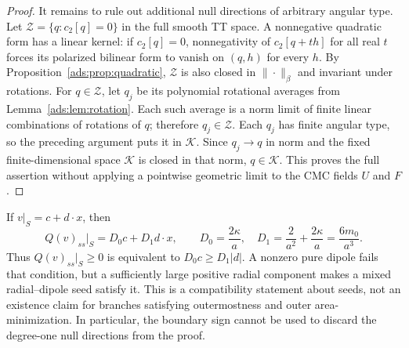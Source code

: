 \begin{proof}
It remains to rule out additional null directions of arbitrary angular
type.  Let $\mathcal Z=\{q:c_2[q]=0\}$ in the full smooth TT space.
A nonnegative quadratic form has a linear kernel: if $c_2[q]=0$,
nonnegativity of $c_2[q+th]$ for all real $t$ forces its polarized
bilinear form to vanish on $(q,h)$ for every $h$.
By Proposition~\ref{ads:prop:quadratic}, $\mathcal Z$ is also closed in
$\|\cdot\|_\beta$ and invariant under rotations.
For $q\in\mathcal Z$, let $q_j$ be its polynomial rotational averages
from Lemma~\ref{ads:lem:rotation}.  Each such average is a norm limit of
finite linear combinations of rotations of $q$; therefore
$q_j\in\mathcal Z$.  Each $q_j$ has finite angular type, so the
preceding argument puts it in $\mathcal K$.
Since $q_j\to q$ in norm and the fixed finite-dimensional space
$\mathcal K$ is closed in that norm, $q\in\mathcal K$.
This proves the full assertion without applying a pointwise geometric
limit to the CMC fields $U$ and $F$.
\end{proof}

\begin{remark}
\label{ads:rem:kernel-sign}
If $v|_S=c+d\cdot x$, then
\[
 Q(v)_{ss}|_S=D_0c+D_1d\cdot x,
 \qquad D_0=\frac{2\kappa}{a},\quad
 D_1=\frac2{a^2}+\frac{2\kappa}{a}=\frac{6m_0}{a^3}.
\]
Thus $Q(v)_{ss}|_S\geq0$ is equivalent to $D_0c\geq D_1|d|$.
A nonzero pure dipole fails that condition, but a sufficiently large
positive radial component makes a mixed radial--dipole seed satisfy
it.  This is a compatibility statement about seeds, not an existence
claim for branches satisfying outermostness and outer
area-minimization.  In particular, the boundary sign cannot be used
to discard the degree-one null directions from the proof.
\end{remark}
